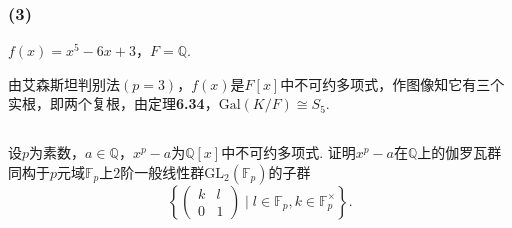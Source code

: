 \subsubsection{(3)}
$f(x)=x^5-6x+3$，$F=\mathbb{Q}$.

\jie 由艾森斯坦判别法$(p=3)$，$f(x)$是$F[x]$中不可约多项式，作图像知它有三个实根，即两个复根，由{\heiti 定理}\textbf{6.34}，$\mathrm{Gal}(K/F)\cong S_5$.

\subsection{}
设$p$为素数，$a\in\mathbb{Q}$，$x^p-a$为$\mathbb{Q}[x]$中不可约多项式. 证明$x^p-a$在$\mathbb{Q}$上的伽罗瓦群同构于$p$元域$\mathbb{F}_p$上$2$阶一般线性群$\mathrm{GL}_2(\mathbb{F}_p)$的子群
$$\left\{
\begin{pmatrix}
	k & l\\
	0 & 1
\end{pmatrix}
\mid l\in\mathbb{F}_p, k\in\mathbb{F}_p^{\times} \right\}.$$

